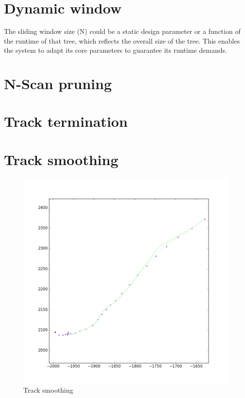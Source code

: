 \section{Dynamic window}
The sliding window size (N) could be a static design parameter or a function of the runtime of that tree, which reflects the overall size of the tree. This enables the system to adapt its core parameters to guarantee its runtime demands. 

\section{N-Scan pruning}


\section{Track termination}

\section{Track smoothing}
\begin{figure}[H]
\centering
\includegraphics[width = .9\textwidth]{Figures/track_smoothing.png}
\caption{Track smoothing}\label{fig:track_smoothing}
\end{figure}